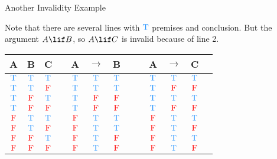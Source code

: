 \documentclass[
  ignorenonframetext,
]{beamer}
\renewcommand{\,}{\text{, }}
\def\True{\textcolor{dodgerblue}{\text{T}}}
\def\False{\textcolor{red}{\text{F}}}
\begin{document}
\begin{frame}{Another Invalidity Example}
\protect\hypertarget{another-invalidity-example}{}

Note that there are several lines with \(\True\) premises and
conclusion. But the argument \(A \lif B\), so \(A \lif C\) is invalid
because of line 2.

\begin{center}
\bigskip
\begin{tabular}{@{ }c@{ }@{ }c@{ }@{ }c | c@{ }@{ }c@{ }@{ }c@{ }@{ }c@{ }@{ }c | c@{ }@{ }c@{ }@{ }c@{ }@{ }c@{ }@{ }c}
A & B & C &  & A & $\rightarrow$ & B &  &  & A & $\rightarrow$ & C & \\
\hline 
$\True$ & $\True$ & $\True$ &  & $\True$ & \textcolor{red}{$\True$} & $\True$ &  &  & $\True$ & \textcolor{red}{$\True$} & $\True$ & \\
$\True$ & $\True$ & $\False$ &  & $\True$ & \textcolor{red}{$\True$} & $\True$ &  &  & $\True$ & \textcolor{red}{$\False$} & $\False$ & \\
$\True$ & $\False$ & $\True$ &  & $\True$ & \textcolor{red}{$\False$} & $\False$ &  &  & $\True$ & \textcolor{red}{$\True$} & $\True$ & \\
$\True$ & $\False$ & $\False$ &  & $\True$ & \textcolor{red}{$\False$} & $\False$ &  &  & $\True$ & \textcolor{red}{$\False$} & $\False$ & \\
$\False$ & $\True$ & $\True$ &  & $\False$ & \textcolor{red}{$\True$} & $\True$ &  &  & $\False$ & \textcolor{red}{$\True$} & $\True$ & \\
$\False$ & $\True$ & $\False$ &  & $\False$ & \textcolor{red}{$\True$} & $\True$ &  &  & $\False$ & \textcolor{red}{$\True$} & $\False$ & \\
$\False$ & $\False$ & $\True$ &  & $\False$ & \textcolor{red}{$\True$} & $\False$ &  &  & $\False$ & \textcolor{red}{$\True$} & $\True$ & \\
$\False$ & $\False$ & $\False$ &  & $\False$ & \textcolor{red}{$\True$} & $\False$ &  &  & $\False$ & \textcolor{red}{$\True$} & $\False$ & \\
\end{tabular}
\end{center}

\end{frame}
\end{document}
